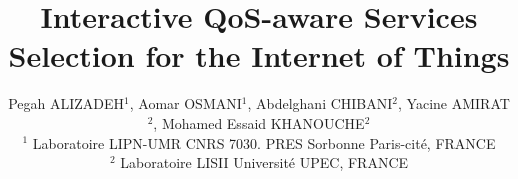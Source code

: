 \documentclass[10pt,journal,compsoc]{IEEEtran}
\begin{document}
%
\title{Interactive QoS-aware Services Selection for the Internet of Things}
%
%
%
%

\author{\small{Pegah ALIZADEH$^{1}$, Aomar OSMANI$^{1}$, %
Abdelghani CHIBANI$^{2}$, Yacine AMIRAT$^{2}$, Mohamed Essaid KHANOUCHE$^{2}$ \\
$^{1}$ Laboratoire LIPN-UMR CNRS 7030. PRES Sorbonne Paris-cit\'e, FRANCE \\    
$^{2}$ Laboratoire LISII  Universit\'e UPEC, FRANCE \\
}}

\end{document}
